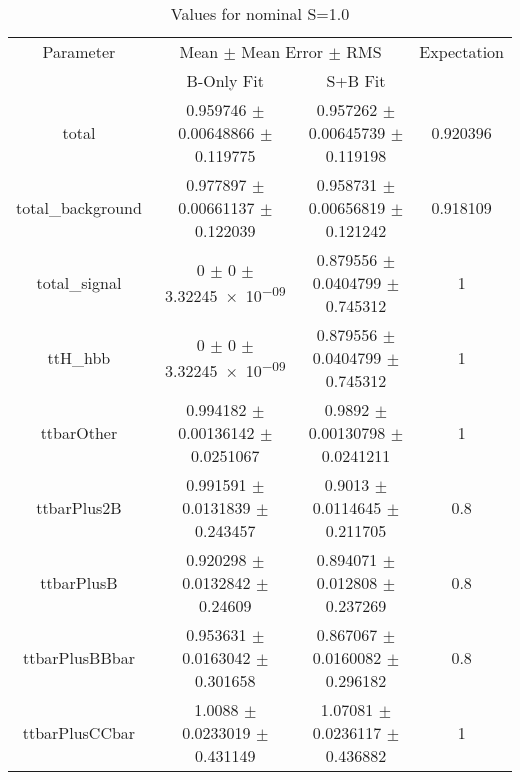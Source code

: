 \begin{table}
\centering
\caption{Values for nominal S=1.0}
\begin{tabular}{cccc}
\toprule
Parameter & \multicolumn{2}{c}{Mean $\pm$ Mean Error $\pm$ RMS} & Expectation\\
 & B-Only Fit & S+B Fit & \\
\midrule
total & \num{0.959746} $\pm$ \num{0.00648866} $\pm$ \num{0.119775} & \num{0.957262} $\pm$ \num{0.00645739} $\pm$ \num{0.119198} & \num{0.920396}\\
total\_background & \num{0.977897} $\pm$ \num{0.00661137} $\pm$ \num{0.122039} & \num{0.958731} $\pm$ \num{0.00656819} $\pm$ \num{0.121242} & \num{0.918109}\\
total\_signal & \num{0} $\pm$ \num{0} $\pm$ \num{3.32245e-09} & \num{0.879556} $\pm$ \num{0.0404799} $\pm$ \num{0.745312} & \num{1}\\
ttH\_hbb & \num{0} $\pm$ \num{0} $\pm$ \num{3.32245e-09} & \num{0.879556} $\pm$ \num{0.0404799} $\pm$ \num{0.745312} & \num{1}\\
ttbarOther & \num{0.994182} $\pm$ \num{0.00136142} $\pm$ \num{0.0251067} & \num{0.9892} $\pm$ \num{0.00130798} $\pm$ \num{0.0241211} & \num{1}\\
ttbarPlus2B & \num{0.991591} $\pm$ \num{0.0131839} $\pm$ \num{0.243457} & \num{0.9013} $\pm$ \num{0.0114645} $\pm$ \num{0.211705} & \num{0.8}\\
ttbarPlusB & \num{0.920298} $\pm$ \num{0.0132842} $\pm$ \num{0.24609} & \num{0.894071} $\pm$ \num{0.012808} $\pm$ \num{0.237269} & \num{0.8}\\
ttbarPlusBBbar & \num{0.953631} $\pm$ \num{0.0163042} $\pm$ \num{0.301658} & \num{0.867067} $\pm$ \num{0.0160082} $\pm$ \num{0.296182} & \num{0.8}\\
ttbarPlusCCbar & \num{1.0088} $\pm$ \num{0.0233019} $\pm$ \num{0.431149} & \num{1.07081} $\pm$ \num{0.0236117} $\pm$ \num{0.436882} & \num{1}\\
\bottomrule
\end{tabular}
\end{table}